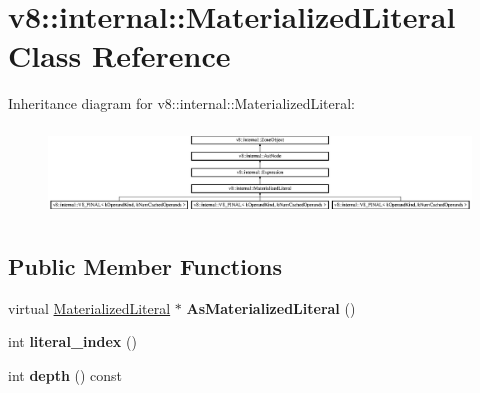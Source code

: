 \hypertarget{classv8_1_1internal_1_1_materialized_literal}{}\section{v8\+:\+:internal\+:\+:Materialized\+Literal Class Reference}
\label{classv8_1_1internal_1_1_materialized_literal}
Inheritance diagram for v8\+:\+:internal\+:\+:Materialized\+Literal\+:\begin{figure}[H]
\begin{center}
\leavevmode
\includegraphics[height=2.380952cm]{classv8_1_1internal_1_1_materialized_literal}
\end{center}
\end{figure}
\subsection*{Public Member Functions}
\begin{DoxyCompactItemize}
\item 
\hypertarget{classv8_1_1internal_1_1_materialized_literal_a49b0d95c5eb43e07e1818f72233383fd}{}virtual \hyperlink{classv8_1_1internal_1_1_materialized_literal}{Materialized\+Literal} $\ast$ {\bfseries As\+Materialized\+Literal} ()\label{classv8_1_1internal_1_1_materialized_literal_a49b0d95c5eb43e07e1818f72233383fd}

\item 
\hypertarget{classv8_1_1internal_1_1_materialized_literal_a4d00be1f53f49592300d1d6218c21fa3}{}int {\bfseries literal\+\_\+index} ()\label{classv8_1_1internal_1_1_materialized_literal_a4d00be1f53f49592300d1d6218c21fa3}

\item 
\hypertarget{classv8_1_1internal_1_1_materialized_literal_a12d60c7878e436d4279987394a6ffa2c}{}int {\bfseries depth} () const \label{classv8_1_1internal_1_1_materialized_literal_a12d60c7878e436d4279987394a6ffa2c}

\end{DoxyCompactItemize}
